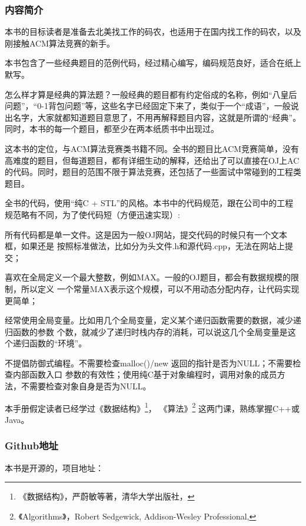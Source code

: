 \subsubsection{内容简介}
本书的目标读者是准备去北美找工作的码农，也适用于在国内找工作的码农，以及刚接触ACM算法竞赛的新手。

本书包含了一些经典题目的范例代码，经过精心编写，编码规范良好，适合在纸上默写。

怎么样才算是经典的算法题？一般经典的题目都有约定俗成的名称，例如“八皇后问题”，“0-1背包问题”等，这些名字已经固定下来了，类似于一个“成语”，一般说出名字，大家就都知道题目意思了，不用再解释题目内容，这就是所谓的“经典”。同时，本书的每一个题目，都至少在两本纸质书中出现过。

这本书的定位，与ACM算法竞赛类书籍不同。全书的题目比ACM竞赛简单，没有高难度的题目，但每道题目，都有详细生动的解释，还给出了可以直接在OJ上AC的代码。同时，题目的范围不限于算法竞赛，还包括了一些面试中常碰到的工程类题目。

全书的代码，使用“纯C + STL”的风格。本书中的代码规范，跟在公司中的工程规范略有不同，为了使代码短（方便迅速实现）:

\begindot
\item 所有代码都是单一文件。这是因为一般OJ网站，提交代码的时候只有一个文本框，如果还是
按照标准做法，比如分为头文件.h和源代码.cpp，无法在网站上提交；

\item 喜欢在全局定义一个最大整数，例如MAX。一般的OJ题目，都会有数据规模的限制，所以定义
一个常量MAX表示这个规模，可以不用动态分配内存，让代码实现更简单；

\item 经常使用全局变量。比如用几个全局变量，定义某个递归函数需要的数据，减少递归函数的参数
个数，就减少了递归时栈内存的消耗，可以说这几个全局变量是这个递归函数的“环境”。

\item 不提倡防御式编程。不需要检查malloc()/new 返回的指针是否为NULL；不需要检查内部函数入口
参数的有效性；使用纯C基于对象编程时，调用对象的成员方法，不需要检查对象自身是否为NULL。
\myenddot

本手册假定读者已经学过《数据结构》\footnote{《数据结构》，严蔚敏等著，清华大学出版社，
}，
《算法》\footnote{《Algorithms》，Robert Sedgewick, Addison-Wesley Professional, }
这两门课，熟练掌握C++或Java。

\subsubsection{Github地址}
本书是开源的，项目地址：
